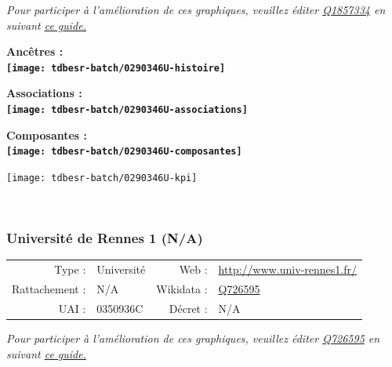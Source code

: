 \documentclass[12pt,french,]{article}
\begin{document}
\textit{\scriptsize Pour participer à l'amélioration de ces graphiques, veuillez éditer  \href{https://www.wikidata.org/entity/Q1857334}{Q1857334}  en suivant \href{https://github.com/cpesr/wikidataESR/blob/master/Rmd/wikidataESR.md}{ce guide.}}

\vspace{1cm}  
\begin{minipage}[b]{0.50\textwidth}\begin{center} \bf Ancêtres : \\  
\texttt{[image: tdbesr-batch/0290346U-histoire]} \end{center}\end{minipage}\begin{minipage}[b]{0.50\textwidth}\begin{center} \bf Associations : \\  
\texttt{[image: tdbesr-batch/0290346U-associations]} \end{center}\end{minipage}

\hrulefill

\begin{center} \bf Composantes : \\  
\texttt{[image: tdbesr-batch/0290346U-composantes]} \end{center}

\begin{center}\texttt{[image: tdbesr-batch/0290346U-kpi]} \end{center}\checkoddpage

\ifoddpage ~\newpage \fi   

\hypertarget{universituxe9-de-rennes-1-na}{%
\subsubsection{Université de Rennes 1
(N/A)}\label{universituxe9-de-rennes-1-na}}

\begin{tabular*}{\textwidth}{rp{5cm}rl}  
\hline  
Type : & Université & Web : &\href{http://www.univ-rennes1.fr/}{http://www.univ-rennes1.fr/} \\  
Rattachement : & N/A & Wikidata : & \href{https://www.wikidata.org/entity/Q726595}{Q726595} \\  
UAI : & 0350936C & Décret : & N/A \\  
\hline  
\end{tabular*}

\textit{\scriptsize Pour participer à l'amélioration de ces graphiques, veuillez éditer  \href{https://www.wikidata.org/entity/Q726595}{Q726595}  en suivant \href{https://github.com/cpesr/wikidataESR/blob/master/Rmd/wikidataESR.md}{ce guide.}}
\end{document}
